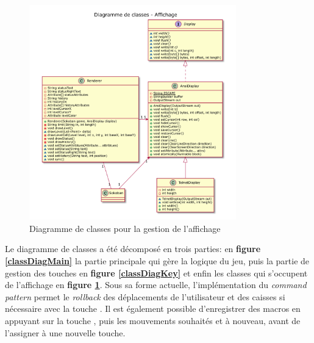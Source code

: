 \documentclass[french]{article}
\begin{document}
	\begin{figure}[H]
		\centering
		\includegraphics[width=0.8\textwidth]{affichage}
		\caption{Diagramme de classes pour la gestion de l'affichage}
		\label{classDiagDisplay}
	\end{figure}
	
	Le diagramme de classes a été décomposé en trois parties: en \textbf{figure \ref{classDiagMain}} la partie principale qui gère la logique du jeu, puis la partie de gestion des touches en \textbf{figure \ref{classDiagKey}} et enfin les classes qui s'occupent de l'affichage en \textbf{figure \ref{classDiagDisplay}}. Sous sa forme actuelle, l'implémentation du \textit{command pattern} permet le \textit{rollback} des déplacements de l'utilisateur et des caisses si nécessaire avec la touche . Il est également possible d'enregistrer des macros en appuyant sur la touche , puis les mouvements souhaités et  à nouveau, avant de l'assigner à une nouvelle touche.
\end{document}
